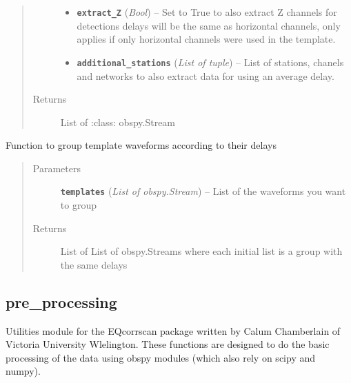 \documentclass[a4paper,10pt,english]{sphinxmanual}
\begin{document}
\begin{fulllineitems}
\begin{quote}
\begin{description}
\begin{itemize}
\item {} 
\textbf{\texttt{extract\_Z}} (\emph{Bool}) -- Set to True to also extract Z channels for detections            delays will be the same as horizontal channels, only applies if            only horizontal channels were used in the template.

\item {} 
\textbf{\texttt{additional\_stations}} (\emph{List of tuple}) -- List of stations, chanels and networks to also            extract data for using an average delay.

\end{itemize}

\item[{Returns}] \leavevmode
List of :class: obspy.Stream

\end{description}\end{quote}

\end{fulllineitems}


\begin{fulllineitems}
\label{utils:clustering.group_delays}
Function to group template waveforms according to their delays
\begin{quote}\begin{description}
\item[{Parameters}] \leavevmode
\textbf{\texttt{templates}} (\emph{List of obspy.Stream}) -- List of the waveforms you want to group

\item[{Returns}] \leavevmode
List of List of obspy.Streams where each initial list is a group            with the same delays

\end{description}\end{quote}

\end{fulllineitems}



\subsection{pre\_processing}
\label{utils:pre-processing}\label{utils:module-pre_processing}
Utilities module for the EQcorrscan package written by Calum Chamberlain of
Victoria University Wlelington.  These functions are designed to do the basic
processing of the data using obspy modules (which also rely on scipy and numpy).
\end{document}
